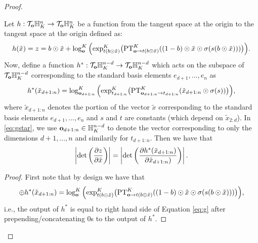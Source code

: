 \begin{proof}
\begin{lemma}
Let $h : \mathcal{T}_{\mathbf{o}}\mathbb{H}^n_K \rightarrow \mathcal{T}_{\mathbf{o}}\mathbb{H}^n_K$ be a function from the tangent space at the origin to the tangent space at the origin defined as:
\begin{equation}\label{eq:g}
h(\tilde{x}) = z = b \odot \tilde{
    x} + \log^K_{\textbf{o}}\Big( \textnormal{exp}^K_{t(b \odot \tilde{x})}\big(\textnormal{PT}^K_{\textbf{o}\to t(b \odot \tilde{x}) }((1-b) \odot \tilde{x} \odot \sigma(s(b \odot \tilde{x})))\big)\Big).
\end{equation}
Now, define a function $h^* : \mathcal{T}_{\mathbf{o}}\mathbb{H}^{n-d}_K \rightarrow \mathcal{T}_{\mathbf{o}}\mathbb{H}^{n-d}_K$ which acts on the subspace of $\mathcal{T}_{\mathbf{o}}\mathbb{H}^{n-d}_K$ corresponding to the standard basis elements $e_{d+1}, ..., e_n$ as
\begin{equation}\label{eq:gstar}
h^*(\tilde{x}_{d+1:n}) =   \log^K_{\mathbf{o}_{d+1:n}}\Big( \textnormal{exp}^K_{t_{d+1:n}}\big(\textnormal{PT}^K_{\mathbf{o}_{d+1:n} \to t_{d+1:n}}( \tilde{x}_{d+1:n} \odot \sigma(s))\big)\Big),
\end{equation}
where $\tilde{x}_{d+1:n}$ denotes the portion of the vector $\tilde{x}$ corresponding to the standard basis elements $e_{d+1}, ..., e_n$ and $s$ and $t$ are constants (which depend on $\tilde{x}_{2:d}$).
In \eqref{eq:gstar}, we use $\mathbf{o}_{d+1:n} \in \mathbb{H}^{n-d}_K$ to denote the vector corresponding to only the dimensions $d+1, ..., n$ and similarily for $t_{d+1:n}$.
Then we have that
\begin{equation}
    \left|\textnormal{det}\left(\frac{\partial z}{\partial \tilde{x}}\right)\right| =    \left|\textnormal{det}\left(\frac{\partial h^*(\tilde{x}_{d+1:n})}{\partial \tilde{x}_{d+1:n})}\right)\right|.
\end{equation}
\end{lemma}
\begin{proof}
First note that by design we have that 
\begin{equation}
    [0,0..,0] \oplus h^*(\tilde{x}_{d+1:n}) = \log^K_{\textbf{o}}\Big( \textnormal{exp}^K_{t(b \odot \tilde{x})}\big(\textnormal{PT}^K_{\textbf{o}\to t(b \odot \tilde{x}) }((1-b) \odot \tilde{x} \odot \sigma(s(b \odot \tilde{x})))\big)\Big),
\end{equation}
i.e., the output of $h^*$ is equal to right hand side of Equation \eqref{eq:g} after prepending/concatenating 0s to the output of $h^*$. 


\end{proof}
\end{proof}

